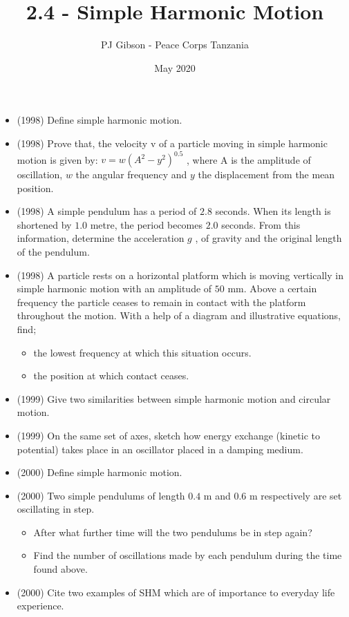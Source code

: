 \documentclass{article}
\title{\textbf{2.4 - Simple Harmonic Motion}}
\author{PJ Gibson - Peace Corps Tanzania}
\date{May 2020}
\begin{document}
\maketitle

\begin{itemize}
\item (1998)  Define simple harmonic motion.
\item (1998)  Prove that, the velocity v of a particle moving in simple harmonic motion is given by: $ v=w(A^{2}-y^{2})^{0.5}$ , where A is the amplitude of oscillation, $ w$ the angular frequency and $ y$ the displacement from the mean position.
\item (1998)  A simple pendulum has a period of $ 2.8$ seconds. When its length is shortened by $ 1.0$ metre, the period becomes $ 2.0$ seconds. From this information, determine the acceleration $ g$ , of gravity and the original length of the pendulum.
\item (1998)  A particle rests on a horizontal platform which is moving vertically in simple harmonic motion with an amplitude of $ 50$ mm. Above a certain frequency the particle ceases to remain in contact with the platform throughout the motion. With a help of a diagram and illustrative equations, find;
 \begin{itemize}
\item the lowest frequency at which this situation occurs.
\item the position at which contact ceases.
\end{itemize}
\item (1999)  Give two similarities between simple harmonic motion and circular motion.
\item (1999)  On the same set of axes, sketch how energy exchange (kinetic to potential) takes place in an oscillator placed in a damping medium.
\item (2000)  Define simple harmonic motion.
\item (2000)  Two simple pendulums of length $ 0.4$ m and $ 0.6$ m respectively are set oscillating in step. 
 \begin{itemize}
\item After what further time will the two pendulums be in step again? 
\item Find the number of oscillations made by each pendulum during the time found above.
\end{itemize}
\item (2000)  Cite two examples of SHM which are of importance to everyday life experience.

\end{itemize}
\end{document}
